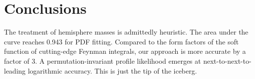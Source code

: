 \section{Conclusions}\label{sec:conclusions}

The treatment of hemisphere masses is admittedly heuristic. The area
under the curve reaches 0.943 for PDF fitting. Compared to the form
factors of the soft function of cutting-edge Feynman integrals, our
approach is more accurate by a factor of 3. A permutation-invariant
profile likelihood emerges at next-to-next-to-leading logarithmic
accuracy. This is just the tip of the iceberg.

